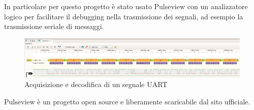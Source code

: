 In particolare per questo progetto è stato usato Pulseview con un analizzatore logico per facilitare il debugging nella trasmissione dei segnali, ad esempio la trasmissione seriale di messaggi.

\begin{figure}[H]
\centering
\includegraphics[width=\textwidth]{images/pulseview.png}
\caption{Acquisizione e decodifica di un segnale UART}
\end{figure}

Pulseview è un progetto open source e liberamente scaricabile dal sito ufficiale\cite{Pulseview}.